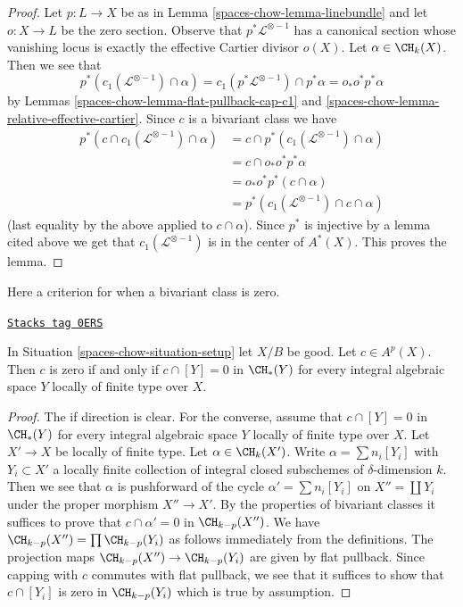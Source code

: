 \begin{proof}
Let $p : L \to X$ be as in Lemma \ref{spaces-chow-lemma-linebundle} and let $o : X \to L$
be the zero section. Observe that $p^*\mathcal{L}^{\otimes -1}$ has a
canonical section whose vanishing locus is exactly the
effective Cartier divisor $o(X)$. Let $\alpha \in \CH_k(X)$. Then we see that
$$
p^*(c_1(\mathcal{L}^{\otimes -1}) \cap \alpha) =
c_1(p^*\mathcal{L}^{\otimes -1}) \cap p^*\alpha =
o_* o^* p^*\alpha
$$
by Lemmas \ref{spaces-chow-lemma-flat-pullback-cap-c1} and
\ref{spaces-chow-lemma-relative-effective-cartier}.
Since $c$ is a bivariant class we have
\begin{align*}
p^*(c \cap c_1(\mathcal{L}^{\otimes -1}) \cap \alpha)
& =
c \cap p^*(c_1(\mathcal{L}^{\otimes -1}) \cap \alpha) \\
& =
c \cap o_* o^* p^*\alpha \\
& =
o_* o^* p^*(c \cap \alpha) \\
& =
p^*(c_1(\mathcal{L}^{\otimes -1}) \cap c \cap \alpha)
\end{align*}
(last equality by the above applied to $c \cap \alpha$).
Since $p^*$ is injective by a lemma cited above we get that
$c_1(\mathcal{L}^{\otimes -1})$
is in the center of $A^*(X)$. This proves the lemma.
\end{proof}

Here a criterion for when a bivariant class is zero.

\begin{lemma}
\label{spaces-chow-lemma-bivariant-zero}
\href{https://stacks.math.columbia.edu/tag/0ERS}{\texttt{Stacks tag 0ERS}}

In Situation \ref{spaces-chow-situation-setup} let $X/B$ be good. Let $c \in A^p(X)$.
Then $c$ is zero if and only if $c \cap [Y] = 0$ in $\CH_*(Y)$
for every integral algebraic space $Y$ locally of finite type over $X$.
\end{lemma}

\begin{proof}
The if direction is clear. For the converse, assume that $c \cap [Y] = 0$ in
$\CH_*(Y)$ for every integral algebraic space $Y$ locally of finite type
over $X$.
Let $X' \to X$ be locally of finite type. Let $\alpha \in \CH_k(X')$.
Write $\alpha = \sum n_i [Y_i]$ with $Y_i \subset X'$ a locally finite
collection of integral closed subschemes of $\delta$-dimension $k$.
Then we see that $\alpha$ is pushforward of the cycle
$\alpha' = \sum n_i[Y_i]$ on $X'' = \coprod Y_i$ under the
proper morphism $X'' \to X'$. By the properties of bivariant
classes it suffices to prove that $c \cap \alpha' = 0$ in $\CH_{k - p}(X'')$.
We have $\CH_{k - p}(X'') = \prod \CH_{k - p}(Y_i)$ as follows immediately
from the definitions. The projection maps
$\CH_{k - p}(X'') \to \CH_{k - p}(Y_i)$
are given by flat pullback. Since capping with $c$ commutes with
flat pullback, we see that it suffices to show that $c \cap [Y_i]$
is zero in $\CH_{k - p}(Y_i)$ which is true by assumption.
\end{proof}

